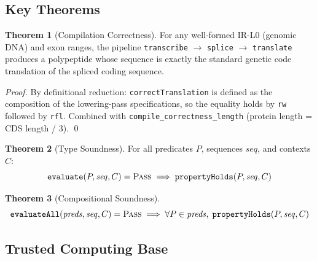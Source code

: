 \documentclass[11pt,a4paper]{article}
\theoremstyle{definition}
\newtheorem{theorem}{Theorem}[section]
\newcommand{\PASS}{\textsc{Pass}}
\begin{document}
\subsection{Key Theorems}

\begin{theorem}[Compilation Correctness]\label{thm:compile}
For any well-formed IR-L0 (genomic DNA) and exon ranges, the pipeline \texttt{transcribe} $\to$ \texttt{splice} $\to$ \texttt{translate} produces a polypeptide whose sequence is exactly the standard genetic code translation of the spliced coding sequence.
\end{theorem}

\begin{proof}
By definitional reduction: \texttt{correctTranslation} is defined as the composition of the lowering-pass specifications, so the equality holds by \texttt{rw} followed by \texttt{rfl}. Combined with \texttt{compile\_correctness\_length} (protein length = CDS length / 3). \qed
\end{proof}

\begin{theorem}[Type Soundness]\label{thm:soundness}
For all predicates $P$, sequences $\mathit{seq}$, and contexts $C$:
$$\texttt{evaluate}(P, \mathit{seq}, C) = \PASS \implies \texttt{propertyHolds}(P, \mathit{seq}, C)$$
\end{theorem}

\begin{theorem}[Compositional Soundness]\label{thm:comp}
$$\texttt{evaluateAll}(\mathit{preds}, \mathit{seq}, C) = \PASS \implies \forall P \in \mathit{preds},\; \texttt{propertyHolds}(P, \mathit{seq}, C)$$
\end{theorem}

\subsection{Trusted Computing Base}
\end{document}
